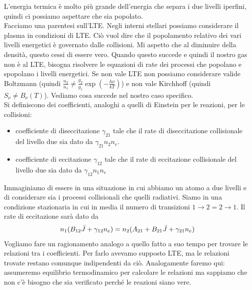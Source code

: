L'energia termica è molto più grande dell'energia che separa i due livelli iperfini, quindi ci possiamo aspettare che sia popolato.\\
Facciamo una parentesi sull'LTE. Negli interni stellari possiamo considerare il plasma in condizioni di LTE. Ciò vuol dire che il popolamento relativo dei vari livelli energetici è governato dalle collisioni. Mi aspetto che al diminuire della densità, questo cessi di essere vero. Quando questo succede e quindi il nostro gas non è al LTE, bisogna risolvere le equazioni di rate dei processi che popolano e spopolano i livelli energetici. Se non vale LTE non possiamo considerare valide Boltzmann (quindi $\frac{n_2}{n_1}\neq\frac{g_2}{g_1}\exp{(-\frac{h\nu}{kT})}$) e non vale Kirchhoff (quindi $S_\nu \neq B_\nu(T)$). Vediamo cosa succede nel nostro caso specifico.\\
Si definiscono dei coefficienti, analoghi a quelli di Einstein per le reazioni, per le collisioni:
\begin{itemize}
    \item coefficiente di diseccitazione $\gamma_{21}$ tale che il rate di diseccitazione collisionale del livello due sia dato da $\gamma_{21}n_2n_e$.
    \item coefficiente di eccitazione $\gamma_{12}$ tale che il rate di eccitazione collisionale del livello due sia dato da $\gamma_{12}n_1n_e$
\end{itemize}
Immaginiamo di essere in una situazione in cui abbiamo un atomo a due livelli e di considerare sia i processi collisionali che quelli radiativi. Siamo in una condizione stazionaria in cui in media il numero di transizioni $1\to2 = 2\to1$. Il rate di eccitazione sarà dato da
\[
    n_1(B_{12}\Bar{J}+\gamma_{12}n_e)=n_2(A_{21}+B_{21}\Bar{J}+\gamma_{21}n_e)
\]
Vogliamo fare un ragionamento analogo a quello fatto a suo tempo per trovare le relazioni tra i coefficienti. Per farlo avevamo supposto LTE, ma le relazioni trovate restano comunque indipendenti da ciò. Analogamente faremo qui: assumeremo equilibrio termodinamico per calcolare le relazioni ma sappiamo che non c'è bisogno che sia verificato perché le reazioni siano vere.\\

